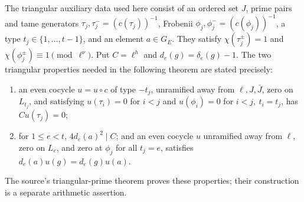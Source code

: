 \documentclass[11pt,a4paper]{article}
\theoremstyle{definition}
\begin{document}
The triangular auxiliary data used here consist
of an ordered set \(J\), prime pairs and tame
generators \(\tau_j,\tau_j^-=(c(\tau_j))^{-1}\),
Frobenii \(\phi_j,\phi_j^-=(c(\phi_j))^{-1}\),
a type \(t_j\in\{1,\ldots,t-1\}\), and an element
\(a\in G_E\). They satisfy
\(\chi(\tau_j^\pm)=1\) and
\(\chi(\phi_j^\pm)\equiv1\pmod{\ell^\nu}\).
Put \(C=\ell^h\) and \(d_e(g)=\delta_e(g)-1\).
The two triangular properties needed in the
following theorem are stated precisely:
\begin{enumerate}[label=(T\arabic*)]
\item an even cocycle \(u=u\circ c\) of type
\(-t_j\), unramified away from \(\ell,J,\bar J\),
zero on \(L_{t_j}\), and satisfying
\(u(\tau_i)=0\) for \(i<j\) and
\(u(\phi_i)=0\) for \(i<j,\ t_i=t_j\),
has \(C u(\tau_j)=0\);
\item for \(1\le e<t\), \(4d_e(a)^2\mid C\); and an even cocycle
\(u\) unramified away from \(\ell\), zero on
\(L_e\), and zero at \(\phi_j\) for all \(t_j=e\),
satisfies
\(d_e(a)u(g)=d_e(g)u(a)\).
\end{enumerate}
The source's triangular-prime theorem proves
these properties; their construction is a
separate arithmetic assertion.
\end{document}
